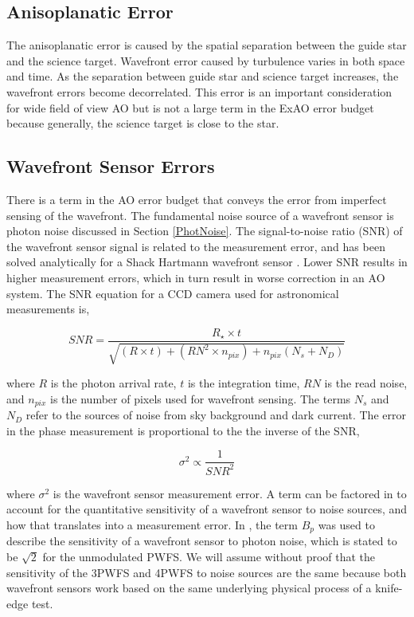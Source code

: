 \subsection{Anisoplanatic Error}

The anisoplanatic error is caused by the spatial separation between the guide star and the science target. Wavefront error caused by turbulence varies in both space and time. As the separation between guide star and science target increases, the wavefront errors become decorrelated. This error is an important consideration for wide field of view AO but is not a large term in the ExAO error budget because generally, the science target is close to the star.

\subsection{Wavefront Sensor Errors}\label{WFSerror}

There is a term in the AO error budget that conveys the error from imperfect sensing of the wavefront. The fundamental noise source of a wavefront sensor is photon noise discussed in Section \ref{PhotNoise}. The signal-to-noise ratio (SNR) of the wavefront sensor signal is related to the measurement error, and has been solved analytically for a Shack Hartmann wavefront sensor \cite{tyler1982image}. Lower SNR results in higher measurement errors, which in turn result in worse correction in an AO system. The SNR equation for a CCD camera used for astronomical measurements is\cite{howell2006handbook},

\begin{equation} 
SNR= \frac{R_\star \times t}{\sqrt{(R \times t)+(RN^2 \times n_{pix})+n_{pix}(N_s+N_D)}}
\label{SNR}
\end{equation}

\noindent where $R$ is the photon arrival rate, $t$ is the integration time, $RN$ is the read noise, and $n_{pix}$ is the number of pixels used for wavefront sensing. The terms $N_s$ and $N_D$ refer to the sources of noise from sky background and dark current. The error in the phase measurement is proportional to the the inverse of the SNR\citep{hardy},

\begin{equation}
    \sigma^2 \propto \frac{1}{SNR^2}
\end{equation}

\noindent where $\sigma^2$ is the wavefront sensor measurement error. A term can be factored in to account for the quantitative sensitivity of a wavefront sensor to noise sources, and how that translates into a measurement error. In \cite{guyon2005}, the term $B_p$ was used to describe the sensitivity of a wavefront sensor to photon noise, which is stated to be $\sqrt{2}$ for the unmodulated PWFS. We will assume without proof that the sensitivity of the 3PWFS and 4PWFS to noise sources are the same because both wavefront sensors work based on the same underlying physical process of a knife-edge test.

